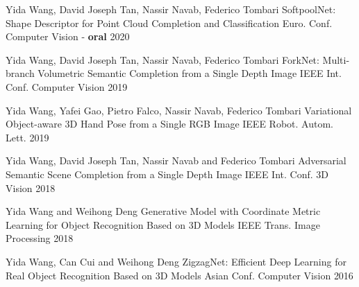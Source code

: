 


\begin{cventries}

\cventry
{Yida Wang, David Joseph Tan, Nassir Navab, Federico Tombari} %
{SoftpoolNet: Shape Descriptor for Point Cloud Completion and Classification} %
{Euro. Conf. Computer Vision - \textbf{oral}} %
{\href{https://www.youtube.com/watch?v=1WZ16bGff1o}{} 2020} %
{ %
}

\cventry
{Yida Wang, David Joseph Tan, Nassir Navab, Federico Tombari} %
{ForkNet: Multi-branch Volumetric Semantic Completion from a Single Depth Image} %
{IEEE Int. Conf. Computer Vision} %
{\href{https://www.youtube.com/watch?v=1WZ16bGff1o}{} 2019} %
{ %
}

\cventry
{Yida Wang, Yafei Gao, Pietro Falco, Nassir Navab, Federico Tombari} %
{Variational Object-aware 3D Hand Pose from a Single RGB Image} %
{IEEE Robot. Autom. Lett.} %
{\href{https://www.youtube.com/watch?v=tSTQ2NTqB4A}{} 2019} %
{ %
}

\cventry
{Yida Wang, David Joseph Tan, Nassir Navab and Federico Tombari} %
{Adversarial Semantic Scene Completion from a Single Depth Image} %
{IEEE Int. Conf. 3D Vision} %
{\href{https://www.youtube.com/watch?v=udvBhkupwXE&t=1s}{} 2018} %
{ %
}

\cventry
{Yida Wang and Weihong Deng} %
{Generative Model with Coordinate Metric Learning for Object Recognition Based on 3D Models} %
{IEEE Trans. Image Processing} %
{2018} %
{ %
}


\cventry
{Yida Wang, Can Cui and Weihong Deng} %
{ZigzagNet: Efficient Deep Learning for Real Object Recognition Based on 3D Models} %
{Asian Conf. Computer Vision} %
{2016} %
{ %
}


\end{cventries}
